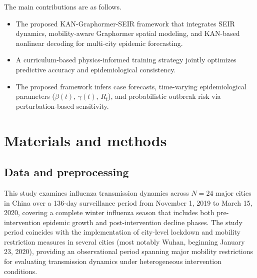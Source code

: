 \documentclass[10pt,letterpaper]{article}
\begin{document}
	
	The main contributions are as follows.
	\begin{itemize}
		\item The proposed KAN-Graphormer-SEIR framework that integrates SEIR dynamics,
		mobility-aware Graphormer spatial modeling, and KAN-based nonlinear
		decoding for multi-city epidemic forecasting.
		\item A curriculum-based physics-informed training strategy jointly
		optimizes predictive accuracy and epidemiological consistency.
		\item The proposed framework infers case forecasts, time-varying epidemiological parameters ($\beta(t)$, $\gamma(t)$, $R_t$), and probabilistic
		outbreak risk via perturbation-based sensitivity.
	\end{itemize}
	
	\section*{Materials and methods}
	
	\subsection*{Data and preprocessing}
	
	This study examines influenza transmission dynamics across $N = 24$ major cities in China over a 136-day surveillance period from November 1, 2019 to March 15, 2020, covering a complete winter influenza season that includes both pre-intervention epidemic growth and post-intervention decline phases. The study period coincides with the implementation of city-level lockdown and mobility restriction measures in several cities (most notably Wuhan, beginning January 23, 2020), providing an observational period spanning major mobility restrictions for evaluating transmission dynamics under heterogeneous intervention
	conditions.
	
\end{document}
